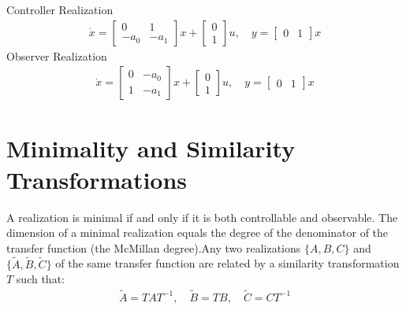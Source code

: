 \documentclass[letterpaper,10pt,english]{jupyterBook}
\begin{document}
\sphinxAtStartPar
Controller Realization
\begin{equation*}
\begin{split}\dot{x} = \begin{bmatrix} 0 & 1 \\ -a_0 & -a_1 \end{bmatrix} x + \begin{bmatrix} 0 \\ 1 \end{bmatrix} u, \quad y = \begin{bmatrix} 0 & 1 \end{bmatrix} x\end{split}
\end{equation*}
\sphinxAtStartPar
Observer Realization
\begin{equation*}
\begin{split}\dot{x} = \begin{bmatrix} 0 & -a_0 \\ 1 & -a_1 \end{bmatrix} x + \begin{bmatrix} 0 \\ 1 \end{bmatrix} u, \quad y = \begin{bmatrix} 0 & 1 \end{bmatrix} x\end{split}
\end{equation*}

\section{Minimality and Similarity Transformations}
\label{\detokenize{ch/system-theory/realizations:minimality-and-similarity-transformations}}
\sphinxAtStartPar
A realization is minimal if and only if it is both controllable and observable. The dimension of a minimal realization equals the degree of the denominator of the transfer function (the McMillan degree).Any two realizations \(\{A, B, C\}\) and \(\{\tilde{A}, \tilde{B}, \tilde{C}\}\) of the same transfer function are related by a similarity transformation \(T\) such that:
\begin{equation*}
\begin{split}\tilde{A} = T A T^{-1}, \quad \tilde{B} = T B, \quad \tilde{C} = C T^{-1}\end{split}
\end{equation*}
\sphinxstepscope
\end{document}
